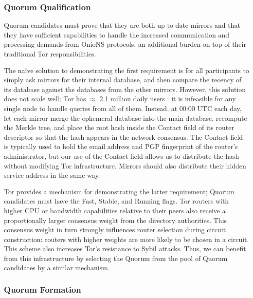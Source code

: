 \documentclass[USenglish,oneside,twocolumn]{article}
\begin{document}
% 

\subsubsection{Quorum Qualification}
\label{sec:qQualification}

Quorum candidates must prove that they are both up-to-date mirrors and that they have sufficient capabilities to handle the increased communication and processing demands from OnioNS protocols, an additional burden on top of their traditional Tor responsibilities.

The na\"{i}ve solution to demonstrating the first requirement is for all participants to simply ask mirrors for their internal database, and then compare the recency of its database against the databases from the other mirrors. However, this solution does not scale well; Tor has $ \approx $ 2.1 million daily users \cite{TorMetrics}: it is infeasible for any single node to handle queries from all of them. Instead, at 00:00 UTC each day, let each mirror merge the ephemeral database into the main database, recompute the Merkle tree, and place the root hash inside the Contact field of its router descriptor so that the hash appears in the network consensus. The Contact field is typically used to hold the email address and PGP fingerprint of the router's administrator, but our use of the Contact field allows us to distribute the hash without modifying Tor infrastructure. Mirrors should also distribute their hidden service address in the same way. %

Tor provides a mechanism for demonstrating the latter requirement; Quorum candidates must have the Fast, Stable, and Running flags. Tor routers with higher CPU or bandwidth capabilities relative to their peers also receive a proportionally larger consensus weight from the directory authorities. This consensus weight in turn strongly influences router selection during circuit construction: routers with higher weights are more likely to be chosen in a circuit. This scheme also increases Tor's resistance to Sybil attacks. Thus, we can benefit from this infrastructure by selecting the Quorum from the pool of Quorum candidates by a similar mechanism.

\subsubsection{Quorum Formation}
\label{sec:qFormation}
\end{document}
